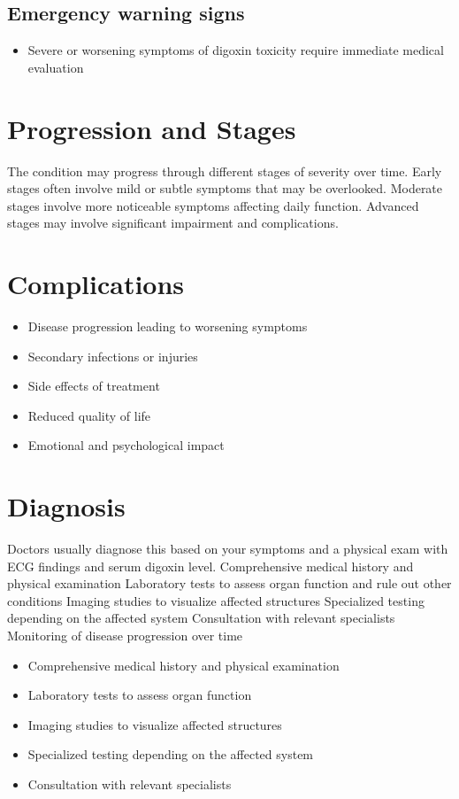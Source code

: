 \subsection{Emergency warning signs}
\begin{itemize}[noitemsep]
  \item Severe or worsening symptoms of digoxin toxicity require immediate medical evaluation
\end{itemize}
\section{Progression and Stages}
The condition may progress through different stages of severity over time. Early stages often involve mild or subtle symptoms that may be overlooked. Moderate stages involve more noticeable symptoms affecting daily function. Advanced stages may involve significant impairment and complications.
\section{Complications}
\begin{itemize}[noitemsep]
  \item Disease progression leading to worsening symptoms
  \item Secondary infections or injuries
  \item Side effects of treatment
  \item Reduced quality of life
  \item Emotional and psychological impact
\end{itemize}
\section{Diagnosis}
Doctors usually diagnose this based on your symptoms and a physical exam with ECG findings and serum digoxin level. Comprehensive medical history and physical examination Laboratory tests to assess organ function and rule out other conditions Imaging studies to visualize affected structures Specialized testing depending on the affected system Consultation with relevant specialists Monitoring of disease progression over time

\begin{itemize}[noitemsep]
  \item Comprehensive medical history and physical examination
  \item Laboratory tests to assess organ function
  \item Imaging studies to visualize affected structures
  \item Specialized testing depending on the affected system
  \item Consultation with relevant specialists
\end{itemize}
